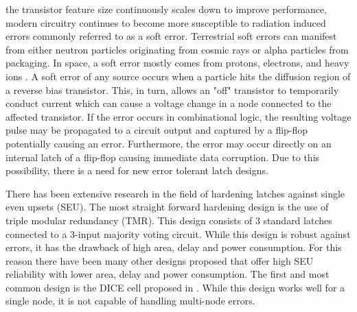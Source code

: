 
% 
 the transistor feature size continuously scales down to improve performance, modern circuitry continues to become more susceptible to radiation induced errors commonly referred to as a soft error. Terrestrial soft errors can manifest from either neutron particles originating from cosmic rays or alpha particles from packaging. In space, a soft error mostly comes from protons, electrons, and heavy ions \cite{Zick2008, Schwank2013}. A soft error of any source occurs when a particle hits the diffusion region of a reverse bias transistor. This, in turn, allows an "off" transistor to temporarily conduct current which can cause a voltage change in a node connected to the affected transistor. If the error occurs in combinational logic, the resulting voltage pulse may be propagated to a circuit output and captured by a flip-flop potentially causing an error. Furthermore, the error may occur directly on an internal latch of a flip-flop causing immediate data corruption. Due to this possibility, there is a need for new error tolerant latch designs.

There has been extensive research in the field of hardening latches against single even upsets (SEU). The most straight forward hardening design is the use of triple modular redundancy (TMR). This design consists of 3 standard latches connected to a 3-input majority voting circuit. While this design is robust against errors, it has the drawback of high area, delay and power consumption. For this reason there have been many other designs proposed that offer high SEU reliability with lower area, delay and power consumption. The first and most common design is the DICE cell proposed in \cite{DICE}. While this design works well for a single node, it is not capable of handling multi-node errors. 

